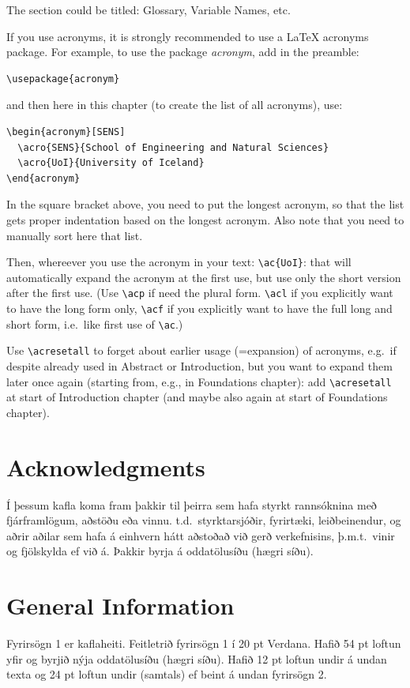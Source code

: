 \documentclass[a4paper,12pt,twoside,BCOR=10mm]{scrbook}
\begin{document}
The section could be titled: Glossary, Variable Names, etc.

If you use acronyms, it is strongly recommended to use a LaTeX
acronyms package. For example, to use the package \emph{acronym}, add
in the preamble:
\begin{verbatim}
\usepackage{acronym}
\end{verbatim}
and then here in this chapter (to create the list of all acronyms), use:
\begin{verbatim}
\begin{acronym}[SENS]
  \acro{SENS}{School of Engineering and Natural Sciences}
  \acro{UoI}{University of Iceland}
\end{acronym}
\end{verbatim}
In the square bracket above, you need to put the longest acronym, so
that the list gets proper indentation based on the longest acronym.
Also note that you need to manually sort here that list.

Then, whereever you use the acronym in your text: \verb|\ac{UoI}|:
that will automatically expand the acronym at the first use, but use
only the short version after the first use.  (Use \verb|\acp| if need
the plural form. \verb|\acl| if you explicitly want to have the long
form only, \verb|\acf| if you explicitly want to have the full long
and short form, i.e.\ like first use of \verb|\ac|.)

Use \verb|\acresetall| to forget about earlier usage (=expansion) of
acronyms, e.g.\ if despite already used in Abstract or Introduction,
but you want to expand them later once again (starting from, e.g., in
Foundations chapter): add \verb|\acresetall| at start of Introduction
chapter (and maybe also again at start of Foundations chapter).

\chapter*{Acknowledgments}
Í þessum kafla koma fram þakkir til þeirra sem hafa styrkt rannsóknina með fjárframlögum, aðstöðu eða vinnu. t.d.\ styrktarsjóðir, fyrirtæki, leiðbeinendur, og aðrir aðilar sem hafa á einhvern hátt aðstoðað við gerð verkefnisins, þ.m.t.\ vinir og fjölskylda ef við á. Þakkir byrja á oddatölusíðu (hægri síðu).


\chapter{General Information}
\setcounter{page}{1}
Fyrirsögn 1 er kaflaheiti. Feitletrið fyrirsögn 1 í 20 pt Verdana. Hafið 54 pt loftun yfir og byrjið nýja oddatölusíðu (hægri síðu). Hafið 12 pt loftun undir á undan texta og 24 pt loftun undir (samtals) ef beint á undan fyrirsögn 2.
\end{document}
